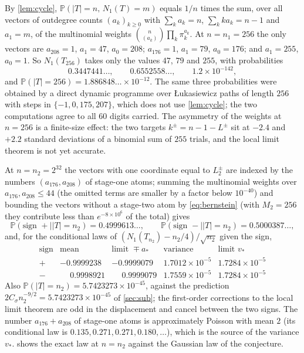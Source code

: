 \documentclass[11pt]{amsart}
\theoremstyle{definition}
\newcommand{\Prob}{\mathbb{P}}
\begin{document}
By \cref{lem:cycle}, $\Prob(|T|=n,\,N_1(T)=m)$ equals $1/n$ times the sum, over all vectors of outdegree counts $(a_k)_{k\ge0}$ with $\sum_ka_k=n$, $\sum_kka_k=n-1$ and $a_1=m$, of the multinomial weights $\binom{n}{(a_k)}\prod_k\pi_k^{a_k}$. At $n=n_1=256$ the only vectors are $a_{208}=1$, $a_1=47$, $a_0=208$; $a_{176}=1$, $a_1=79$, $a_0=176$; and $a_1=255$, $a_0=1$. So $N_1(T_{256})$ takes only the values $47$, $79$ and $255$, with probabilities
\[
0.3447441\ldots,\qquad0.6552558\ldots,\qquad1.2\times10^{-142},
\]
and $\Prob(|T|=256)=1.886848\ldots\times10^{-12}$. The same three probabilities were obtained by a direct dynamic programme over \L ukasiewicz paths of length $256$ with steps in $\{-1,0,175,207\}$, which does not use \cref{lem:cycle}; the two computations agree to all $60$ digits carried. The asymmetry of the weights at $n=256$ is a finite-size effect: the two targets $k^\pm=n-1-L^\pm$ sit at $-2.4$ and $+2.2$ standard deviations of a binomial sum of $255$ trials, and the local limit theorem is not yet accurate.

At $n=n_2=2^{32}$ the vectors with one coordinate equal to $L_2^\pm$ are indexed by the numbers $(a_{176},a_{208})$ of stage-one atoms; summing the multinomial weights over $a_{176},a_{208}\le44$ (the omitted terms are smaller by a factor below $10^{-40}$) and bounding the vectors without a stage-two atom by \eqref{eq:bernstein} (with $M_2=256$ they contribute less than $e^{-8\times10^6}$ of the total) gives
\[
\Prob(\text{sign }+\mid|T|=n_2)=0.4999613\ldots,\qquad\Prob(\text{sign }-\mid|T|=n_2)=0.5000387\ldots,
\]
and, for the conditional laws of $(N_1(T_{n_2})-n_2/4)/\sqrt{n_2}$ given the sign,
\[
\begin{array}{c|cc|cc}
\text{sign} & \text{mean} & \text{limit }\mp a_* & \text{variance} & \text{limit }v_*\\ \hline
+ & -0.9999238 & -0.9999079 & 1.7012\times10^{-5} & 1.7284\times10^{-5}\\
- & \phantom{-}0.9998921 & \phantom{-}0.9999079 & 1.7559\times10^{-5} & 1.7284\times10^{-5}
\end{array}
\]
Also $\Prob(|T|=n_2)=5.7423273\times10^{-45}$, against the prediction $2C_\sigma n_2^{-9/2}=5.7423273\times10^{-45}$ of \cref{sec:sub}; the first-order corrections to the local limit theorem are odd in the displacement and cancel between the two signs. The number $a_{176}+a_{208}$ of stage-one atoms is approximately Poisson with mean $2$ (its conditional law is $0.135,0.271,0.271,0.180,\dots$), which is the source of the variance $v_*$.  shows the exact law at $n=n_2$ against the Gaussian law of the conjecture.
\end{document}
